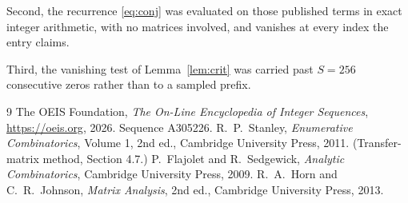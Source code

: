 \documentclass[11pt,a4paper]{article}
\theoremstyle{plain}
\theoremstyle{definition}
\begin{document}
Second, the recurrence \eqref{eq:conj} was evaluated on those published terms in exact
integer arithmetic, with no matrices involved, and vanishes at every index the entry claims.

Third, the vanishing test of Lemma~\ref{lem:crit} was carried past $S=256$ consecutive
zeros rather than to a sampled prefix.

\begin{thebibliography}{9}
 The OEIS Foundation, \emph{The On-Line Encyclopedia of Integer
Sequences}, \url{https://oeis.org}, 2026. Sequence A305226.
 R.~P.~Stanley, \emph{Enumerative Combinatorics}, Volume 1, 2nd ed.,
Cambridge University Press, 2011. (Transfer-matrix method, Section 4.7.)
 P.~Flajolet and R.~Sedgewick, \emph{Analytic Combinatorics}, Cambridge
University Press, 2009.
 R.~A.~Horn and C.~R.~Johnson, \emph{Matrix Analysis}, 2nd ed., Cambridge
University Press, 2013.
\end{thebibliography}
\end{document}
